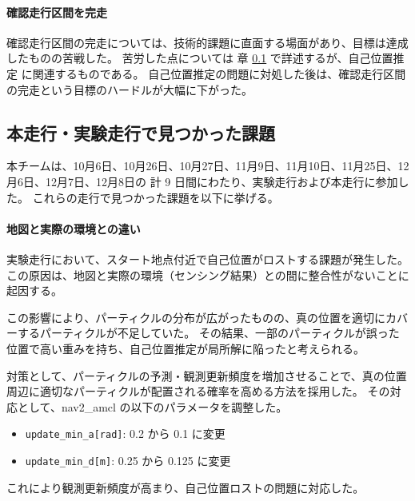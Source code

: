 \documentclass[twocolumn,9pt]{jsproceedings}
\begin{document}
\paragraph{確認走行区間を完走}
確認走行区間の完走については、技術的課題に直面する場面があり、目標は達成したものの苦戦した。
苦労した点については 章 \ref{sec:4} で詳述するが、自己位置推定 に関連するものである。
自己位置推定の問題に対処した後は、確認走行区間の完走という目標のハードルが大幅に下がった。


\subsection{本走行・実験走行で見つかった課題}\label{sec:4}

本チームは、10月6日、10月26日、10月27日、11月9日、11月10日、11月25日、12月6日、12月7日、12月8日の
計 9 日間にわたり、実験走行および本走行に参加した。
これらの走行で見つかった課題を以下に挙げる。

\paragraph{地図と実際の環境との違い}
実験走行において、スタート地点付近で自己位置がロストする課題が発生した。
この原因は、地図と実際の環境（センシング結果）との間に整合性がないことに起因する。

この影響により、パーティクルの分布が広がったものの、真の位置を適切にカバーするパーティクルが不足していた。
その結果、一部のパーティクルが誤った位置で高い重みを持ち、自己位置推定が局所解に陥ったと考えられる。

対策として、パーティクルの予測・観測更新頻度を増加させることで、真の位置周辺に適切なパーティクルが配置される確率を高める方法を採用した。
その対応として、nav2\_amcl の以下のパラメータを調整した。

\begin{itemize}
  \item \texttt{update\_min\_a[rad]}: 0.2 から 0.1 に変更  
  \item \texttt{update\_min\_d[m]}: 0.25 から 0.125 に変更  
\end{itemize}
これにより観測更新頻度が高まり、自己位置ロストの問題に対応した。

\end{document}
